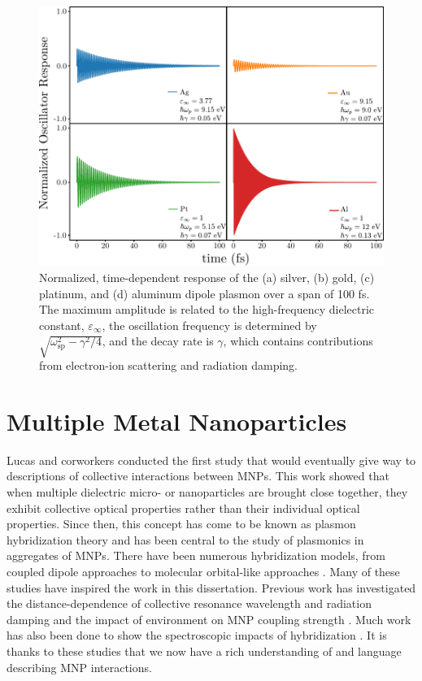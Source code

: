 \documentclass [11pt, proquest] {uwthesis}[2016/11/22]
\begin{document}
\begin{figure}
\begin{centering}
\includegraphics{all_alpha.pdf}
\caption{Normalized, time-dependent response of the (a) silver, (b) gold, (c) platinum, and (d) aluminum dipole plasmon over a span of 100 fs. The maximum amplitude is related to the high-frequency dielectric constant, $\varepsilon_{\infty}$, the oscillation frequency is determined by $\sqrt{\omega_{\textrm{sp}}^2 - \gamma^2/4}$, and the decay rate is $\gamma$, which contains contributions from electron-ion scattering and radiation damping.}
\label{alpha_metals}
\end{centering}
\end{figure}


\section{Multiple Metal Nanoparticles}

Lucas and corworkers \cite{Lucas1976} conducted the first study that would eventually give way to descriptions of collective interactions between MNPs. This work showed that when multiple dielectric micro- or nanoparticles are brought close together, they exhibit collective optical properties rather than their individual optical properties. Since then, this concept has come to be known as plasmon hybridization theory and has been central to the study of plasmonics in aggregates of MNPs. There have been numerous hybridization models, from coupled dipole approaches \cite{Schatz2003} to molecular orbital-like approaches \cite{Oubre2004,NordProdan2004}. Many of these studies have inspired the work in this dissertation. Previous work has investigated the distance-dependence of collective resonance wavelength and radiation damping \cite{vonPlessen2007} and the impact of environment on MNP coupling strength \cite{Elsayed2008}. Much work has also been done to show the spectroscopic impacts of hybridization \cite{Xu1995,Mischenko1995}. It is thanks to these studies that we now have a rich understanding of and language describing MNP interactions. 
\end{document}
